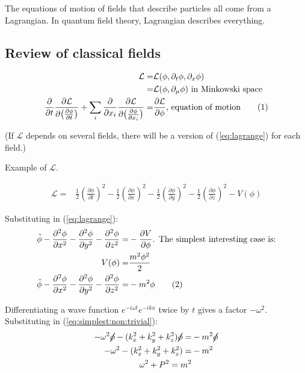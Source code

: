 \documentclass[]{article}
\newcommand\numberthis{\addtocounter{equation}{1}\tag{\theequation}}
\begin{document}
The equations of motion of fields that describe  particles all come from a Lagrangian. In quantum field theory, Lagrangian describes everything.

\subsection{Review of classical fields}

\begin{align*}
\mathcal{L}=& \mathcal{L}(\phi,\partial_t \phi, \partial_x \phi)\\
=&\mathcal{L}(\phi,\partial_{\mu} \phi) \text{ in Minkowski space}\\
\frac{\partial}{\partial t} \frac{\partial \mathcal{L}}{\partial \big(\frac{\partial \phi}{\partial t}\big)}+\sum_i \frac{\partial}{\partial x_i} \frac{\partial \mathcal{L}}{\partial \big(\frac{\partial \phi}{\partial x_i}\big)}=&\frac{\partial \mathcal{L}}{\partial \phi} \text{, equation of motion} \numberthis \label{eq:lagrange}
\end{align*}

(If $\mathcal{L}$ depends on several fields, there will be a version of (\ref{eq:lagrange})  for each field.)

Example of $\mathcal{L}$.

\begin{align*}
	\mathcal{L} =& \frac{1}{2} (\frac{\partial \phi}{\partial t})^2 - \frac{1}{2} (\frac{\partial \phi}{\partial x})^2 - \frac{1}{2} (\frac{\partial \phi}{\partial y})^2 - \frac{1}{2} (\frac{\partial \phi}{\partial z})^2 - V(\phi)
\end{align*}

Substituting in (\ref{eq:lagrange}):
\begin{align*}
	\ddot{\phi} - \frac{\partial^2 \phi}{\partial x^2}  - \frac{\partial^2 \phi}{\partial y^2}  - \frac{\partial^2 \phi}{\partial z^2} =& - \frac{\partial V}{\partial \phi} \text{. The simplest interesting case is:}\\
	V(\phi) =& \frac{m^2 \phi^2}{2}\\
	\ddot{\phi} - \frac{\partial^2 \phi}{\partial x^2}  - \frac{\partial^2 \phi}{\partial y^2}  - \frac{\partial^2 \phi}{\partial z^2} =& - m^2 \phi \numberthis \label{eq:simplest:non:trivial}
\end{align*}

Differentiating a wave function $e^{-i \omega t} e^{-i k x}$ twice by $t$ gives a factor $-\omega^2$. Substituting in (\ref{eq:simplest:non:trivial}):
\begin{align*}
-\omega^2 \cancel{\phi} - (k_x^2+k_y^2+k_z^2)\cancel{\phi} =& -m^2 \cancel{\phi}\\
-\omega^2  - (k_x^2+k_y^2+k_z^2) =& -m^2 \\
\omega^2 + P^2 = m^2
\end{align*}
\end{document}
